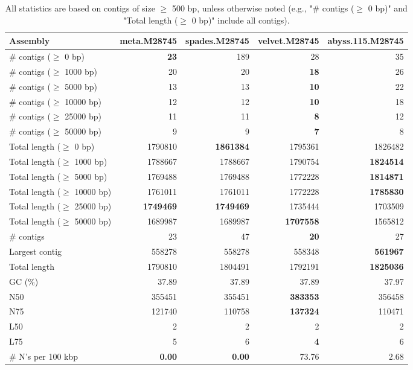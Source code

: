 \documentclass[12pt,a4paper]{article}
\begin{document}
\begin{table}[ht]
\begin{center}
\caption{All statistics are based on contigs of size $\geq$ 500 bp, unless otherwise noted (e.g., "\# contigs ($\geq$ 0 bp)" and "Total length ($\geq$ 0 bp)" include all contigs).}
\begin{tabular}{|l*{4}{|r}|}
\hline
Assembly & meta.M28745 & spades.M28745 & velvet.M28745 & abyss.115.M28745 \\ \hline
\# contigs ($\geq$ 0 bp) & {\bf 23} & 189 & 28 & 35 \\ \hline
\# contigs ($\geq$ 1000 bp) & 20 & 20 & {\bf 18} & 26 \\ \hline
\# contigs ($\geq$ 5000 bp) & 13 & 13 & {\bf 10} & 22 \\ \hline
\# contigs ($\geq$ 10000 bp) & 12 & 12 & {\bf 10} & 18 \\ \hline
\# contigs ($\geq$ 25000 bp) & 11 & 11 & {\bf 8} & 12 \\ \hline
\# contigs ($\geq$ 50000 bp) & 9 & 9 & {\bf 7} & 8 \\ \hline
Total length ($\geq$ 0 bp) & 1790810 & {\bf 1861384} & 1795361 & 1826482 \\ \hline
Total length ($\geq$ 1000 bp) & 1788667 & 1788667 & 1790754 & {\bf 1824514} \\ \hline
Total length ($\geq$ 5000 bp) & 1769488 & 1769488 & 1772228 & {\bf 1814871} \\ \hline
Total length ($\geq$ 10000 bp) & 1761011 & 1761011 & 1772228 & {\bf 1785830} \\ \hline
Total length ($\geq$ 25000 bp) & {\bf 1749469} & {\bf 1749469} & 1735444 & 1703509 \\ \hline
Total length ($\geq$ 50000 bp) & 1689987 & 1689987 & {\bf 1707558} & 1565812 \\ \hline
\# contigs & 23 & 47 & {\bf 20} & 27 \\ \hline
Largest contig & 558278 & 558278 & 558348 & {\bf 561967} \\ \hline
Total length & 1790810 & 1804491 & 1792191 & {\bf 1825036} \\ \hline
GC (\%) & 37.89 & 37.89 & 37.89 & 37.97 \\ \hline
N50 & 355451 & 355451 & {\bf 383353} & 356458 \\ \hline
N75 & 121740 & 110758 & {\bf 137324} & 110471 \\ \hline
L50 & 2 & 2 & 2 & 2 \\ \hline
L75 & 5 & 6 & {\bf 4} & 6 \\ \hline
\# N's per 100 kbp & {\bf 0.00} & {\bf 0.00} & 73.76 & 2.68 \\ \hline
\end{tabular}
\end{center}
\end{table}
\end{document}
